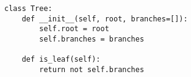 \begin{lstlisting}
class Tree:
    def __init__(self, root, branches=[]):
        self.root = root
        self.branches = branches

    def is_leaf(self):
        return not self.branches
\end{lstlisting}
